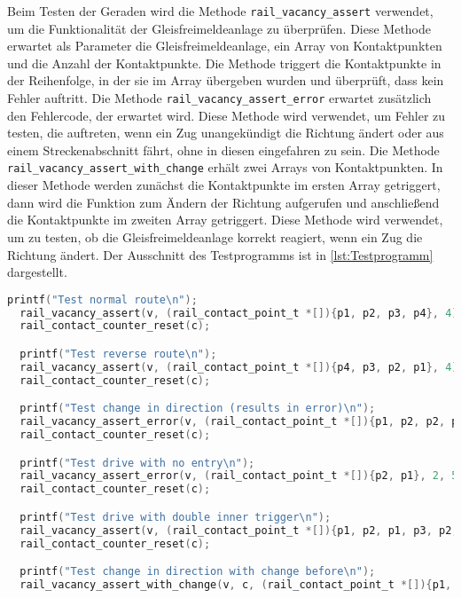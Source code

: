 Beim Testen der Geraden wird die Methode \texttt{rail\_vacancy\_assert} verwendet, um die Funktionalität der Gleisfreimeldeanlage zu überprüfen. Diese Methode erwartet als Parameter die Gleisfreimeldeanlage, ein Array von Kontaktpunkten und die Anzahl der Kontaktpunkte. Die Methode triggert die Kontaktpunkte in der Reihenfolge, in der sie im Array übergeben wurden und überprüft, dass kein Fehler auftritt.\newline 
Die Methode \texttt{rail\_vacancy\_assert\_error} erwartet zusätzlich den Fehlercode, der erwartet wird. Diese Methode wird verwendet, um Fehler zu testen, die auftreten, wenn ein Zug unangekündigt die Richtung ändert oder aus einem Streckenabschnitt fährt, ohne in diesen eingefahren zu sein.\newline 
Die Methode \texttt{rail\_vacancy\_assert\_with\_change} erhält zwei Arrays von Kontaktpunkten. In dieser Methode werden zunächst die Kontaktpunkte im ersten Array getriggert, dann wird die Funktion zum Ändern der Richtung aufgerufen und anschließend die Kontaktpunkte im zweiten Array getriggert. Diese Methode wird verwendet, um zu testen, ob die Gleisfreimeldeanlage korrekt reagiert, wenn ein Zug die Richtung ändert. Der Ausschnitt des Testprogramms ist in \autoref{lst:Testprogramm} dargestellt.

\begin{lstlisting}[caption={Ausschnitt des Testprogramms für Geraden},label={lst:Testprogramm},language=C]
  printf("Test normal route\n");
  rail_vacancy_assert(v, (rail_contact_point_t *[]){p1, p2, p3, p4}, 4);
  rail_contact_counter_reset(c);

  printf("Test reverse route\n");
  rail_vacancy_assert(v, (rail_contact_point_t *[]){p4, p3, p2, p1}, 4);
  rail_contact_counter_reset(c);

  printf("Test change in direction (results in error)\n");
  rail_vacancy_assert_error(v, (rail_contact_point_t *[]){p1, p2, p2, p1}, 4, 4);
  rail_contact_counter_reset(c);

  printf("Test drive with no entry\n");
  rail_vacancy_assert_error(v, (rail_contact_point_t *[]){p2, p1}, 2, 5);
  rail_contact_counter_reset(c);

  printf("Test drive with double inner trigger\n");
  rail_vacancy_assert(v, (rail_contact_point_t *[]){p1, p2, p1, p3, p2, p4, p3, p4}, 8);
  rail_contact_counter_reset(c);

  printf("Test change in direction with change before\n");
  rail_vacancy_assert_with_change(v, c, (rail_contact_point_t *[]){p1, p2, p1, p2}, 4, (rail_contact_point_t *[]){p2, p1, p2, p1}, 4);
\end{lstlisting}


